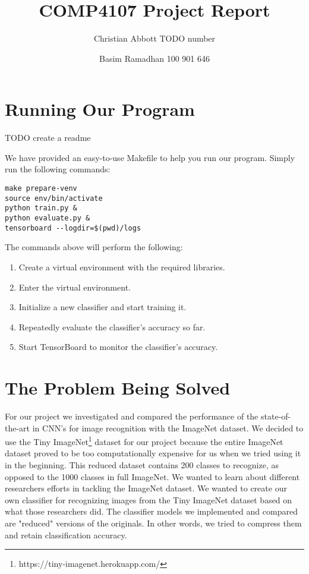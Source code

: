 \documentclass[10pt]{article} %
\title{COMP4107 Project Report}
\author{Christian Abbott TODO number}
\date{Basim Ramadhan 100 901 646} %
\begin{document}
\maketitle

\section{Running Our Program}

TODO create a readme

We have provided an easy-to-use Makefile to help you run our program. Simply run the following commands:

\begin{tcolorbox}
\begin{verbatim}
make prepare-venv
source env/bin/activate
python train.py & 
python evaluate.py &
tensorboard --logdir=$(pwd)/logs
\end{verbatim}
\end{tcolorbox}

The commands above will perform the following:

\begin{enumerate}
	\item Create a virtual environment with the required libraries.
	\item Enter the virtual environment.
	\item Initialize a new classifier and start training it.
	\item Repeatedly evaluate the classifier's accuracy so far.
	\item Start TensorBoard to monitor the classifier's accuracy.
\end{enumerate}

\section{The Problem Being Solved}

For our project we investigated and compared the performance of the state-of-the-art in CNN's for image recognition with the ImageNet dataset. We decided to use the Tiny ImageNet\footnote{https://tiny-imagenet.herokuapp.com/} dataset for our project because the entire ImageNet dataset proved to be too computationally expensive for us when we tried using it in the beginning. This reduced dataset contains 200 classes to recognize, as opposed to the 1000 classes in full ImageNet. We wanted to learn about different researchers efforts in tackling the ImageNet dataset. We wanted to create our own classifier for recognizing images from the Tiny ImageNet dataset based on what those researchers did. The classifier models we implemented and compared are "reduced" versions of the originals. In other words, we tried to compress them and retain classification accuracy.
\end{document}
